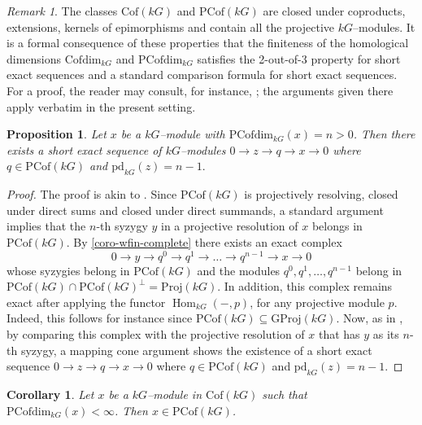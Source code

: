 \documentclass{amsart}
\newcommand{\Hom}{\operatorname{Hom}\nolimits}
\numberwithin{equation}{section}%
\newtheorem{proposition}[equation]{Proposition}
\newtheorem{corollary}[equation]{Corollary}
\theoremstyle{remark}
\newtheorem{remark}[equation]{Remark}
\begin{document}
{\begin{remark}
\label{rem:finiteness}
The classes $\mathrm{Cof}(kG)$ and $\mathrm{PCof}(kG)$ are closed under coproducts, extensions, kernels of epimorphisms and contain all the projective $kG$--modules. It is a formal consequence of these properties that the finiteness of the homological dimensions $\mathrm{Cofdim}_{kG}$ and $\mathrm{PCofdim}_{kG}$ satisfies the 2-out-of-3 property for short exact sequences and a standard comparison formula for short exact sequences. 
For a proof, the reader may consult, for instance, \cite[Section~2]{DE}; the arguments given there apply verbatim in the present setting.
\end{remark}

\begin{proposition}
\label{prop:sex_cof}
Let $x$ be a $kG$--module with $\mathrm{PCofdim}_{kG}(x)=n>0$. Then there exists a short exact sequence of $kG$--modules $0\rightarrow z\rightarrow q\rightarrow x\rightarrow 0$ where $q\in\mathrm{PCof}(kG)$ and $\mathrm{pd}_{kG}(z)=n-1.$
\end{proposition}

\begin{proof}
The proof is akin to \cite[Theorem~2.10]{Holm}. Since $\mathrm{PCof}(kG)$ is projectively resolving, 
closed under direct sums and closed under direct summands, a standard argument implies that the $n$-th syzygy $y$ in a projective resolution of $x$ belongs in $\mathrm{PCof}(kG)$. By \cref{coro-wfin-complete} there exists an exact complex 
\[
0\rightarrow y\rightarrow q^0\rightarrow q^1\rightarrow \dots \rightarrow q^{n-1}\rightarrow x\rightarrow 0
\]
whose syzygies belong in $\mathrm{PCof}(kG)$ and the modules $q^0,q^1,\dots,q^{n-1}$ belong in $\mathrm{PCof}(kG)\cap\mathrm{PCof}(kG)^{\bot}=\mathrm{Proj}(kG)$. In addition, this complex remains exact after applying the functor $\Hom_{kG}(-,p)$, for any projective module $p$. Indeed,  this follows for instance since $\mathrm{PCof}(kG)\subseteq \mathrm{GProj}(kG)$. Now, as in \cite[Theorem~2.10]{Holm}, by comparing this complex with the projective resolution of $x$ that has $y$ as its $n$-th syzygy, a mapping cone argument shows the existence of a short exact sequence $0\rightarrow z\rightarrow q\rightarrow x\rightarrow 0$ where $q\in\mathrm{PCof}(kG)$ and $\mathrm{pd}_{kG}(z)=n-1.$
\end{proof}

\begin{corollary}
\label{cor:pcofs}
Let $x$ be a $kG$--module in $\mathrm{Cof}(kG)$ such that $\mathrm{PCofdim}_{kG}(x)<\infty$. Then $x\in\mathrm{PCof}(kG)$.
\end{corollary}

}
\end{document}
